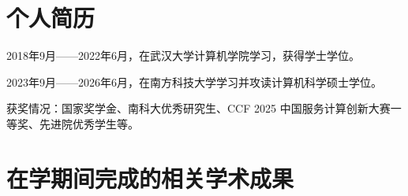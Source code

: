 
\begin{resume}

  \section*{个人简历} %


  2018年9月——2022年6月，在武汉大学计算机学院学习，获得学士学位。

  2023年9月——2026年6月，在南方科技大学学习并攻读计算机科学硕士学位。

  获奖情况：国家奖学金、南科大优秀研究生、CCF 2025 中国服务计算创新大赛一等奖、先进院优秀学生等。








  \section*{在学期间完成的相关学术成果}


\end{resume}
